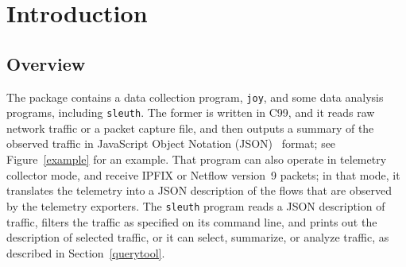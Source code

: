 \documentclass{book}
\begin{document}
\mainmatter

\tableofcontents





\chapter{Introduction}

\section{Overview}
The  package contains a data collection program,
\texttt{joy}, and some data analysis programs, including
\texttt{sleuth}.  The former is written in C99, and it reads raw
network traffic or a packet capture file, and then outputs a summary
of the observed traffic in JavaScript Object Notation
(JSON)~\cite{rfc7159} format; see Figure~\ref{example} for an example.
That program can also operate in telemetry collector mode, and receive
IPFIX
or Netflow version~9 packets; in that mode, it translates
the telemetry into a JSON description of the flows that are observed
by the telemetry exporters.  The \texttt{sleuth} program reads a JSON
description of traffic, filters the traffic as specified on its
command line, and prints out the description of selected traffic, or
it can select, summarize, or analyze traffic, as described in
Section~\ref{querytool}.
\end{document}
